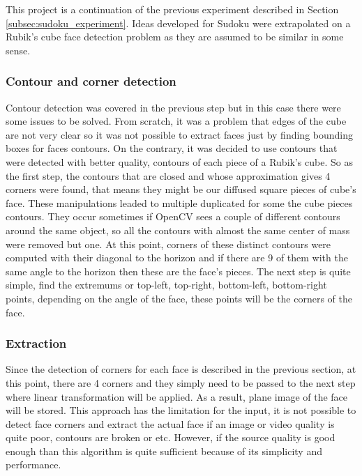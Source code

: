 \documentclass[../../main]{subfiles}
\begin{document}
This project is a continuation of the previous experiment described in Section \ref{subsec:sudoku_experiment}. Ideas developed for Sudoku were extrapolated on a Rubik's cube face detection problem as they are assumed to be similar in some sense.

\subsubsection{Contour and corner detection}

Contour detection was covered in the previous step but in this case there were some issues to be solved.
From scratch, it was a problem that edges of the cube are not very clear so it was not possible to extract faces just by finding bounding boxes for faces contours. On the contrary, it was decided to use contours that were detected with better quality, contours of each piece of a Rubik's cube. So as the first step, the contours that are closed and whose approximation gives 4 corners were found, that means they might be our diffused square pieces of cube's face. These manipulations leaded to multiple duplicated for some the cube pieces contours. They occur sometimes if \ac{OpenCV} sees a couple of different contours around the same object, so all the contours with almost the same center of mass were removed but one. At this point, corners of these distinct contours were computed with their diagonal to the horizon and if there are 9 of them with the same angle to the horizon then these are the face's pieces. The next step is quite simple, find the extremums or top-left, top-right, bottom-left, bottom-right points, depending on the angle of the face, these points will be the corners of the face.

\subsubsection{Extraction}

Since the detection of corners for each face is described in the previous section, at this point, there are 4 corners and they simply need to be passed to the next step where linear transformation will be applied. As a result, plane image of the face will be stored.
This approach has the limitation for the input, it is not possible to detect face corners and extract the actual face if an image or video quality is quite poor, contours are broken or etc. However, if the source quality is good enough than this algorithm is quite sufficient because of its simplicity and performance.
\end{document}
